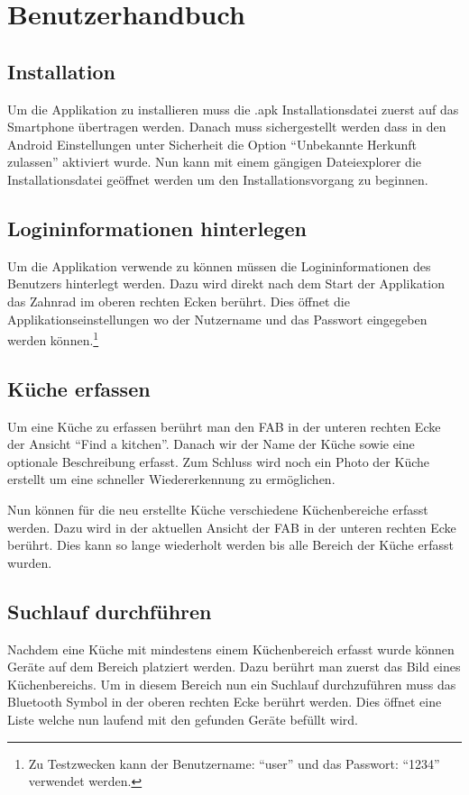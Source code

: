 \pagebreak
\section{Benutzerhandbuch}

\subsection{Installation}
Um die Applikation zu installieren muss die .apk Installationsdatei zuerst auf das Smartphone übertragen werden. Danach muss sichergestellt werden dass in den Android Einstellungen unter Sicherheit die Option \enquote{Unbekannte Herkunft zulassen} aktiviert wurde. Nun kann mit einem gängigen Dateiexplorer die Installationsdatei geöffnet werden um den Installationsvorgang zu beginnen.

\subsection{Logininformationen hinterlegen}
Um die Applikation verwende zu können müssen die Logininformationen des Benutzers hinterlegt werden. Dazu wird direkt nach dem Start der Applikation das Zahnrad im oberen rechten Ecken berührt. Dies öffnet die Applikationseinstellungen wo der Nutzername und das Passwort eingegeben werden können.\footnote{Zu Testzwecken kann der Benutzername: \enquote{user} und das Passwort: \enquote{1234} verwendet werden.}

\subsection{Küche erfassen}
Um eine Küche zu erfassen berührt man den \acl{FAB} in der unteren rechten Ecke der Ansicht \enquote{Find a kitchen}. Danach wir der Name der Küche sowie eine optionale Beschreibung erfasst. Zum Schluss wird noch ein Photo der Küche erstellt um eine schneller Wiedererkennung zu ermöglichen.

Nun können für die neu erstellte Küche verschiedene Küchenbereiche erfasst werden. Dazu wird in der aktuellen Ansicht der \acl{FAB} in der unteren rechten Ecke berührt. Dies kann so lange wiederholt werden bis alle Bereich der Küche erfasst wurden.

\subsection{Suchlauf durchführen}

Nachdem eine Küche mit mindestens einem Küchenbereich erfasst wurde können Geräte auf dem Bereich platziert werden. Dazu berührt man zuerst das Bild eines Küchenbereichs. Um in diesem Bereich nun ein Suchlauf durchzuführen muss das Bluetooth Symbol in der oberen rechten Ecke berührt werden. Dies öffnet eine Liste welche nun laufend mit den gefunden Geräte befüllt wird. 

